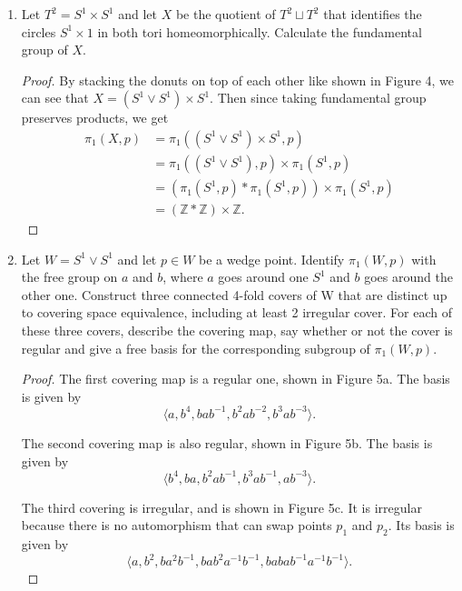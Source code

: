 \documentclass{article}
\begin{document}
\begin{enumerate}[label={\bf Q\arabic*:}]
  \item Let $T^2=S^1\times S^1$ and let $X$ be the quotient of $T^2\sqcup
    T^2$ that identifies the circles $S^1\times1$ in both tori
    homeomorphically. Calculate the fundamental group of $X$.
    \begin{proof}
      By stacking the donuts on top of each other like shown in Figure 4,
      we can see that $X=(S^1\vee S^1)\times S^1$. Then since taking
      fundamental group preserves products, we get
      \begin{align*}
        \pi_1(X,p) &= \pi_1((S^1\vee S^1)\times S^1,p) \\
                   &= \pi_1((S^1\vee S^1),p)\times \pi_1(S^1,p) \\
                   &= (\pi_1(S^1,p)\ast\pi_1(S^1,p))\times \pi_1(S^1,p) \\
                   &= (\mathbb{Z}\ast\mathbb{Z})\times\mathbb{Z}.
      \end{align*}
    \end{proof}

  \item Let $W=S^1\vee S^1$ and let $p\in W$ be a wedge point. Identify
    $\pi_1(W,p)$ with the free group on $a$ and $b$, where $a$ goes around
    one $S^1$ and $b$ goes around the other one. Construct three connected
    4-fold covers of W that are distinct up to covering space equivalence,
    including at least 2 irregular cover. For each of these three covers,
    describe the covering map, say whether or not the cover is regular and
    give a free basis for the corresponding subgroup of $\pi_1(W,p)$.

    \begin{proof}
      The first covering map is a regular one, shown in Figure 5a. The
      basis is given by
      \begin{equation*}
        \langle a,b^4,bab^{-1},b^2ab^{-2},b^3ab^{-3}\rangle.
      \end{equation*}

      The second covering map is also regular, shown in Figure 5b. The
      basis is given by
      \begin{equation*}
        \langle b^4,ba,b^2ab^{-1},b^3ab^{-1},ab^{-3}\rangle.
      \end{equation*}

      The third covering is irregular, and is shown in Figure 5c. It is
      irregular because there is no automorphism that can swap points $p_1$
      and $p_2$. Its basis is given by
      \begin{equation*}
        \langle
        a,b^2,ba^2b^{-1},bab^2a^{-1}b^{-1},babab^{-1}a^{-1}b^{-1}\rangle.
      \end{equation*}
    \end{proof}


\end{enumerate}
\end{document}

